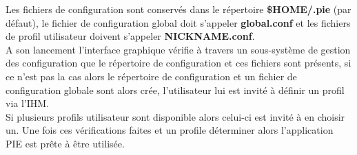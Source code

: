 Les fichiers de configuration sont conservés dans le répertoire \textbf{\$HOME/.pie} (par défaut), le fichier
de configuration global doit s'appeler \textbf{global.conf} et les fichiers de profil utilisateur doivent
s'appeler \textbf{NICKNAME.conf}. \\

A son lancement l'interface graphique vérifie à travers un sous-système de gestion des configuration
que le répertoire de configuration et ces fichiers sont présents, si ce n'est pas la cas alors le
répertoire de configuration et un fichier de configuration globale sont alors crée, l'utilisateur lui
est invité à définir un profil via l'IHM. \\

Si plusieurs profils utilisateur sont disponible alors celui-ci est invité à en choisir un. Une fois ces
vérifications faites et un profile déterminer alors l'application PIE est prête à être utilisée.

